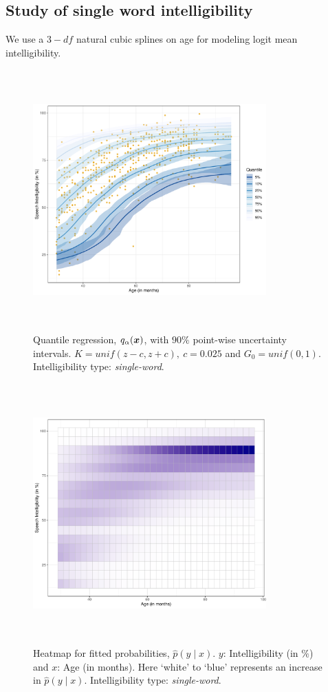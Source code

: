 \documentclass{article}[12pt]
\newcommand{\bx}{\mbox{\boldmath $x$}}
\begin{document}
\subsection{%
Study of single word intelligibility}
We use a $3-df$ natural cubic splines on age for modeling logit mean intelligibility.
\begin{figure}[H]
    \centering
    \includegraphics[width = 0.8\textwidth, height = 10cm]{plots/quantilesRDS3SingleWord.pdf}
    \caption{Quantile regression, $q_{\alpha}(\bx)$, with $90\%$ point-wise uncertainty intervals. $K = unif(z - c, z + c), \ c = 0.025$ and $G_0 = unif(0, 1)$. Intelligibility type: \textit{single-word}.}
    \label{fig:1}
\end{figure}

\begin{figure}[H]
    \centering
    \includegraphics[width = 0.8\textwidth, height = 10cm]{plots/heatmapRDS3SingleWord.pdf}
    \caption{Heatmap for fitted probabilities, $\widehat p(y \mid x)$. $y$: Intelligibility (in $\%$) and $x$: Age (in months). Here `white' to `blue' represents an increase in $\widehat p(y \mid x)$. Intelligibility type: \textit{single-word}.}
    \label{fig:2}
\end{figure}
\end{document}
